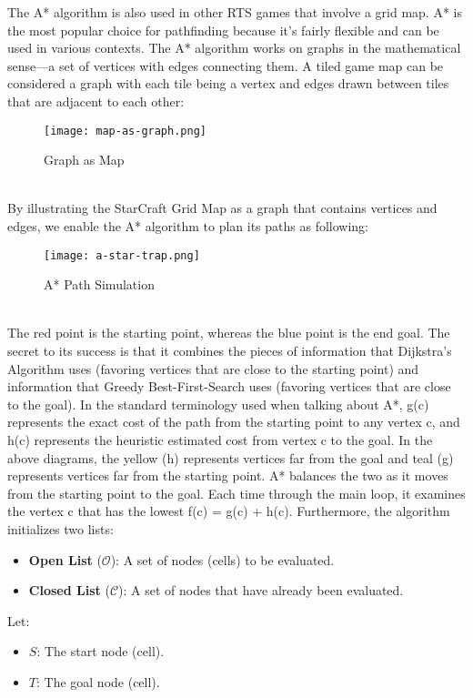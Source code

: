 \documentclass[12pt]{article}
\begin{document}
The A* algorithm is also used in other RTS games that involve a grid map. A* is the most popular choice for pathfinding because it’s fairly flexible and can be used in various contexts. The A* algorithm works on graphs in the mathematical sense—a set of vertices with edges connecting them. A tiled game map can be considered a graph with each tile being a vertex and edges drawn between tiles that are adjacent to each other:\\
\begin{figure}[h] 
    \centering
    \texttt{[image: map-as-graph.png]} %
    \caption{Graph as Map}
    \label{fig:example}
\end{figure}
\\
By illustrating the StarCraft Grid Map as a graph that contains vertices and edges, we enable the A* algorithm to plan its paths as following:
\begin{figure}[h] 
    \centering
    \texttt{[image: a-star-trap.png]} %
    \caption{A* Path Simulation}
    \label{fig:example}
\end{figure}
\\ The red point is the starting point, whereas the blue point is the end goal. The secret to its success is that it combines the pieces of information that Dijkstra’s Algorithm uses (favoring vertices that are close to the starting point) and information that Greedy Best-First-Search uses (favoring vertices that are close to the goal). In the standard terminology used when talking about A*, g(c) represents the exact cost of the path from the starting point to any vertex c, and h(c) represents the heuristic estimated cost from vertex c to the goal. In the above diagrams, the yellow (h) represents vertices far from the goal and teal (g) represents vertices far from the starting point. A* balances the two as it moves from the starting point to the goal. Each time through the main loop, it examines the vertex c that has the lowest f(c) = g(c) + h(c). Furthermore, the algorithm initializes two lists:
\begin{itemize}
  \item \textbf{Open List} (\( \mathcal{O} \)): A set of nodes (cells) to be evaluated.
  \item \textbf{Closed List} (\( \mathcal{C} \)): A set of nodes that have already been evaluated.
\end{itemize}

Let:
\begin{itemize}
  \item \( S \): The start node (cell).
  \item \( T \): The goal node (cell).
\end{itemize}
\end{document}
